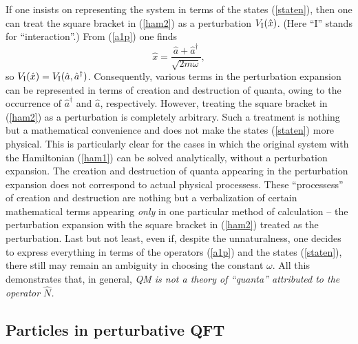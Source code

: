 \documentclass[12pt]{article}
\begin{document}
If one insists on representing the system in terms of the states 
(\ref{staten}), then one can treat the square bracket in (\ref{ham2}) 
as a perturbation $V_{\rm I}(\hat{x})$. (Here ``I'' stands for
``interaction''.) 
From (\ref{a1p}) one finds 
\begin{equation}\label{e81}
\hat{x}=\frac{\hat{a}+\hat{a}^{\dagger}}{\sqrt{2m\omega}} ,
\end{equation}
so $V_{\rm I}(\hat{x})=V_{\rm I}(\hat{a},\hat{a}^{\dagger})$.
Consequently,
various terms in the perturbation expansion can be represented 
in terms of creation and destruction of quanta, owing to
the occurrence of $\hat{a}^{\dagger}$ and $\hat{a}$, respectively.
However, treating the square bracket in (\ref{ham2}) as a 
perturbation is completely arbitrary. Such a treatment 
is nothing but a mathematical convenience and does not make 
the states (\ref{staten}) more physical. This is particularly 
clear for the cases in which the original system with the 
Hamiltonian (\ref{ham1}) can be solved analytically, without 
a perturbation expansion. The creation and destruction of 
quanta appearing in the perturbation expansion does not
correspond to actual physical processess. 
These ``processess'' of creation and destruction are nothing 
but a verbalization of certain mathematical terms appearing {\em only} 
in one particular method of calculation -- the perturbation expansion 
with the square bracket in (\ref{ham2}) treated as 
the perturbation. Last but not least, even if, despite the unnaturalness, 
one decides to express everything in terms of the operators
(\ref{a1p}) and the states (\ref{staten}), there still may remain an 
ambiguity in choosing the constant $\omega$.   
All this demonstrates that, in general, {\em QM
is not a theory of ``quanta'' attributed to the operator $\hat{N}$.}

\subsection{Particles in perturbative QFT}
\end{document}
